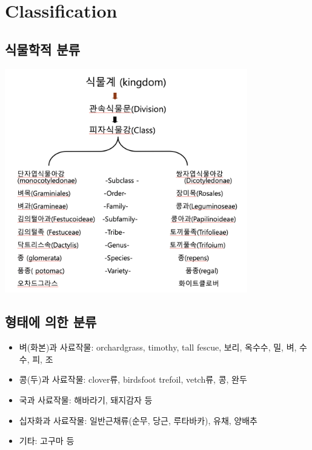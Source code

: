 \documentclass[]{book}
\providecommand{\tightlist}{%
  \setlength{\itemsep}{0pt}\setlength{\parskip}{0pt}}
\begin{document}
\chapter{Classification}\label{classification}

\section{식물학적 분류}\label{-}

\includegraphics[width=400]{figures/kingdom}

\section{형태에 의한 분류}\label{--}

\begin{itemize}
\tightlist
\item
  벼(화본)과 사료작물: orchardgrass, timothy, tall fescue, 보리, 옥수수,
  밀, 벼, 수수, 피, 조
\item
  콩(두)과 사료작물: clover류, birdsfoot trefoil, vetch류, 콩, 완두
\item
  국과 사료작물: 해바라기, 돼지감자 등\\
\item
  십자화과 사료작물: 일반근채류(순무, 당근, 루타바카), 유채, 양배추
\item
  기타: 고구마 등
\end{itemize}
\end{document}
